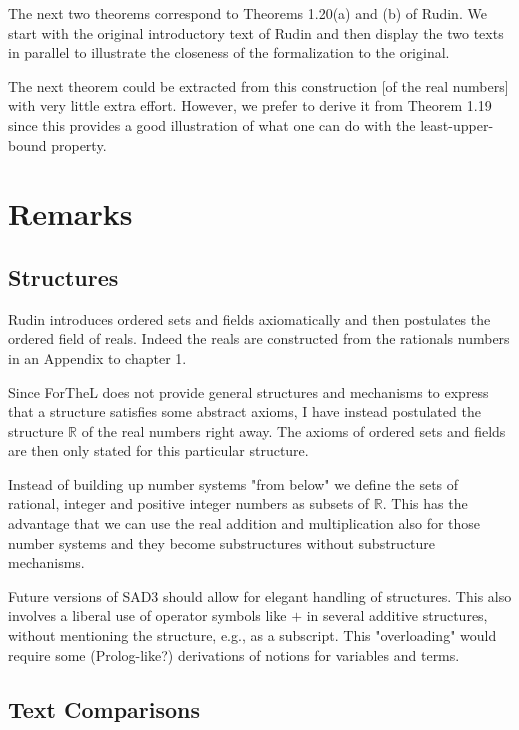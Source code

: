 \documentclass{article}
\begin{document}
\newpage
The next two theorems correspond to Theorems 1.20(a) and (b) of Rudin. We start with the original introductory text of Rudin and then display the two texts in parallel to illustrate the closeness of the formalization to the original.

\vspace{1cm}

The next theorem could be extracted from this construction [of the real numbers] with very little extra effort. However, we prefer to derive it from Theorem 1.19 since this provides a good illustration of what one can do with the least-upper-bound property.


\newpage


\section{Remarks}
\subsection{Structures}

Rudin introduces ordered sets and fields axiomatically and then postulates the ordered field of reals. Indeed the reals are constructed from the rationals numbers in an Appendix to chapter 1.

Since ForTheL does not provide general structures and mechanisms to express that a structure satisfies some abstract axioms, I have instead postulated the structure $\mathbb{R}$ of the real numbers right away. The axioms of ordered sets and fields are then only stated for this particular structure.

Instead of building up number systems "from below" we define the sets of rational, integer and positive integer numbers as subsets of $\mathbb{R}$. This has the advantage that we can use the real addition and multiplication also for those number systems and they become substructures without substructure mechanisms.

Future versions of SAD3 should allow for elegant handling of structures. This also involves a liberal use of operator symbols like $+$ in several additive structures, without mentioning the structure, e.g., as a subscript. This "overloading" would require some (Prolog-like?) derivations of notions for variables and terms.

\subsection{Text Comparisons}
\end{document}
